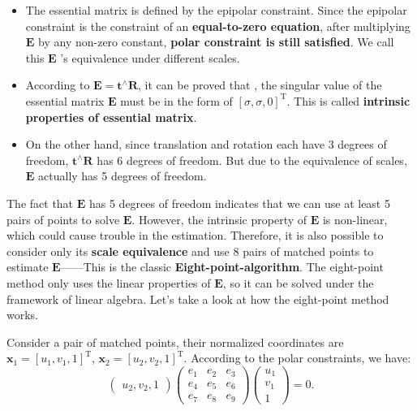 \begin{itemize}
	\item The essential matrix is defined by the epipolar constraint. Since the epipolar constraint is the constraint of an \textbf{equal-to-zero equation}, after multiplying $\bm{E}$ by any non-zero constant, \textbf{polar constraint is still satisfied}. We call this $\bm{E}$ 's equivalence under different scales.
	\item According to $\bm{E} = \bm{t}^ \wedge \bm{R}$, it can be proved that \textsuperscript{\cite{Hartley2003}}, the singular value of the essential matrix $\bm{E}$ must be in the form of $[\sigma, \sigma, 0]^\mathrm{T}$. This is called \textbf{intrinsic properties of essential matrix}.
	\item On the other hand, since translation and rotation each have 3 degrees of freedom, $\bm{t}^\wedge \bm{R}$ has 6 degrees of freedom. But due to the equivalence of scales, $\bm{E}$ actually has 5 degrees of freedom.
\end{itemize}

The fact that $\bm{E}$ has 5 degrees of freedom indicates that we can use at least 5 pairs of points to solve $\bm{E}$. However, the intrinsic property of $\bm{E}$ is non-linear, which could cause trouble in the estimation. Therefore, it is also possible to consider only its \textbf{scale equivalence} and use 8 pairs of matched points to estimate $\bm{E}$——This is the classic \textbf{Eight-point-algorithm}\textsuperscript{\cite{Hartley1997, Longuet-Higgins1987}}. The eight-point method only uses the linear properties of $\bm{E}$, so it can be solved under the framework of linear algebra. Let's take a look at how the eight-point method works.

Consider a pair of matched points, their normalized coordinates are $\bm{x}_{1}=[u_{1},v_{1},1]^\mathrm{T}$, $\bm{x}_{2}=[u_{2},v_{2},1]^{\mathrm{T}}$. According to the polar constraints, we have:
\begin{equation}
\begin{pmatrix} 
u_{2},v_{2},1
\end{pmatrix}
\begin{pmatrix}
 e_{1} & e_{2} & e_{3}\\ 
 e_{4} & e_{5} & e_{6}\\ 
 e_{7} & e_{8} & e_{9} 
\end{pmatrix}
\begin{pmatrix} 
u_{1}\\v_{1}\\1
\end{pmatrix}
=0.
\end{equation}

